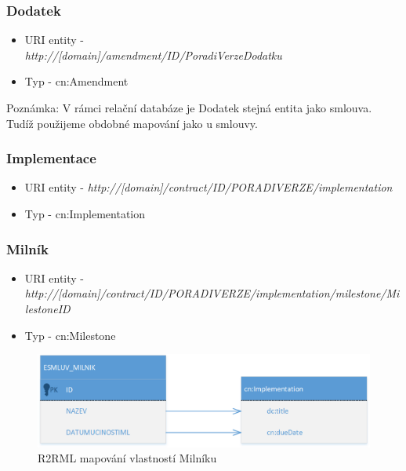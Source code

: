 \subsubsection*{Dodatek}

\begin{itemize}
\item URI entity  -\\\textit{http://[domain]/amendment/{ID}/{PoradiVerzeDodatku}}
\item Typ - cn:Amendment
\end{itemize}

Poznámka:
V rámci relační databáze je Dodatek stejná entita jako smlouva. Tudíž použijeme obdobné mapování jako u smlouvy.

\subsubsection*{Implementace}

\begin{itemize}
\item URI entity - \textit{http://[domain]/contract/{ID}/{PORADIVERZE}/implementation}
\item Typ - cn:Implementation
\end{itemize}

\subsubsection*{Milník}

\begin{itemize}
\item URI entity  - \textit{http://[domain]/contract/{ID}/{PORADIVERZE}/implementation/milestone/{MilestoneID}}
\item Typ - cn:Milestone
\end{itemize}

\begin{figure}[H]
\centerline{\includegraphics[width=\textwidth]{img/mapMilestone.eps}}
\caption{R2RML mapování vlastností Milníku}
\label{obr:mapMilestone}
\end{figure}

